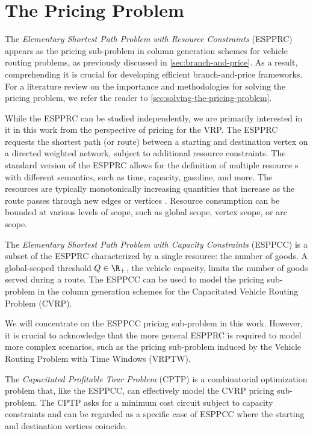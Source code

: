 \chapter{The Pricing Problem}
\label{sec:the-pricing-problem}

The \textit{Elementary Shortest Path Problem with Resource Constraints} (ESPPRC)
appears as the pricing sub-problem in column generation schemes
for vehicle routing problems, as previously discussed in \cref{sec:branch-and-price}.
As a result, comprehending it is crucial for developing efficient branch-and-price frameworks.
For a literature review on the importance and methodologies
for solving the pricing problem,
we refer the reader to  \cref{sec:solving-the-pricing-problem}.

While the ESPPRC can be studied independently,
we are primarily interested in it in this work from the perspective of pricing for the VRP.
The ESPPRC requests the shortest path (or route)
between a starting and destination vertex on a directed weighted network,
subject to additional resource constraints.
The standard version of the ESPPRC allows for the definition of multiple resource
s with different semantics, such as time, capacity, gasoline, and more.
The resources are typically monotonically increasing quantities
that increase as the route passes through new edges or vertices \parencite{irnich2005, irnich2007resource}.
Resource consumption can be bounded at various levels of scope,
such as global scope, vertex scope, or arc scope.

The \textit{Elementary Shortest Path Problem with Capacity Constraints} (ESPPCC)
is a subset of the ESPPRC characterized by a single resource: the number of goods.
A global-scoped threshold $Q \in \R_{+}$, the vehicle capacity,
limits the number of goods served during a route.
The ESPPCC can be used to model the pricing sub-problem in the column
generation schemes for the Capacitated Vehicle Routing Problem (CVRP).

We will concentrate on the ESPPCC pricing sub-problem in this work.
However,
it is crucial to acknowledge that the more general ESPPRC is required to model more complex scenarios,
such as the pricing sub-problem induced by the Vehicle Routing Problem with Time Windows (VRPTW).

The \textit{Capacitated Profitable Tour Problem} (CPTP)
is a combinatorial optimization problem that, like the ESPPCC,
can effectively model the CVRP pricing sub-problem.
The CPTP asks for a minimum cost circuit subject to capacity constraints
and can be regarded as a specific case of ESPPCC where the starting
and destination vertices coincide.

